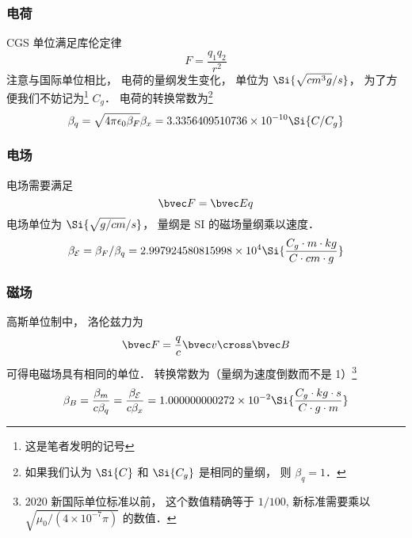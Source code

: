 
\begin{issues}
\issueDraft
\end{issues}


\subsubsection{电荷}
CGS 单位满足库伦定律
\begin{equation}
F = \frac{q_1 q_2}{r^2}
\end{equation}
注意与国际单位相比， 电荷的量纲发生变化， 单位为 $\Si{\sqrt{cm^3 g}/s}$， 为了方便我们不妨记为\footnote{这是笔者发明的记号} $C_g$． 电荷的转换常数为\footnote{如果我们认为 $\Si{C}$ 和 $\Si{C_g}$ 是相同的量纲， 则 $\beta_q = 1$．}
\begin{equation}
\beta_q = \sqrt{4\pi\epsilon_0\beta_F} \beta_x = 3.3356409510736\times 10^{-10} \Si{C/C_g}
\end{equation}

\subsubsection{电场}
电场需要满足
\begin{equation}
\bvec F = \bvec E q
\end{equation}
电场单位为 $\Si{\sqrt{g/cm}/s}$， 量纲是 SI 的磁场量纲乘以速度．
\begin{equation}
\beta_{\mathcal E} = \beta_F/\beta_q = 2.997924580815998\times 10^4 \Si{\frac{C_g\cdot m\cdot kg}{C\cdot cm\cdot g}}
\end{equation}

\subsubsection{磁场}
高斯单位制中， 洛伦兹力为
\begin{equation}
\bvec F = \frac{q}{c} \bvec v \cross \bvec B
\end{equation}
可得电磁场具有相同的单位． 转换常数为（量纲为速度倒数而不是 1）\footnote{2020 新国际单位标准以前， 这个数值精确等于 $1/100$, 新标准需要乘以 $\sqrt{\mu_0/(4\times 10^{-7}\pi)}$ 的数值．}
\begin{equation}
\beta_B = \frac{\beta_m}{c\beta_q} = \frac{\beta_{\mathcal E}}{c\beta_x} = 1.000000000272\times 10^{-2} \Si{\frac{C_g\cdot kg \cdot s}{C \cdot g \cdot m}}
\end{equation}
